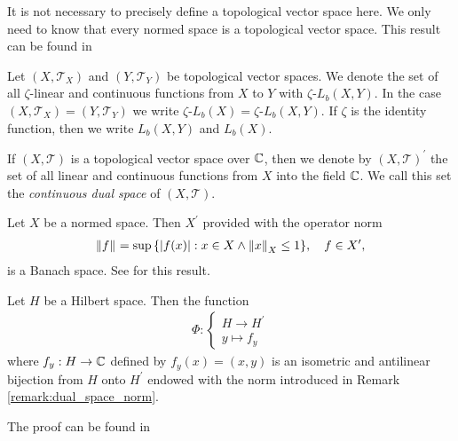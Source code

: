 It is not necessary to precisely define a topological vector space here. We only need to know that every normed space is a topological vector space. This result can be found in \cite[p. 18]{FAna1}


\begin{definition}
	Let $(X,\mathcal{T}_X)$ and $(Y,\mathcal{T}_Y)$ be topological vector spaces. We denote the set of all $\zeta$-linear and continuous functions from $X$ to $Y$ with $\zeta$-$L_b(X,Y)$. In the case $(X, \mathcal{T}_X) = (Y, \mathcal{T}_Y)$ we write $\zeta$-$L_b(X) = \zeta$-$L_b(X,Y)$. If $\zeta$ is the identity function, then we write $L_b(X,Y)$ and $L_b(X)$.
\end{definition}


\begin{definition}
	If $(X, \mathcal{T})$ is a topological vector space over $\C$, then we denote by $(X, \mathcal{T})^\prime$ the set of all linear and continuous functions from $X$ into the field $\C$. We call this set the \textit{continuous dual space} of $(X, \mathcal{T})$.
\end{definition}

\begin{remark} \label{remark:dual_space_norm}
	Let $X$ be a normed space. Then $X^\prime$ provided with the operator norm 
	\begin{align*}
		\norm{f} = \sup\Bbraces{\vbraces{f(x)} : x \in X \land \norm[X]{x} \leq 1}, \quad f \in X^\prime,
	\end{align*}
	is a Banach space. See \cite[p. 25]{FAna1} for this result.
\end{remark}


\begin{proposition} \label{prop:riesz}
	Let $H$ be a Hilbert space. Then the function
	\begin{align*}
		\Phi: 
		\begin{cases}
			H \to H^\prime \\
			y \mapsto f_y
		\end{cases}
	\end{align*}
	where $f_y: H \to \C$ defined by $f_y(x) = (x,y)$ is an isometric and antilinear bijection from $H$ onto $H^\prime$ endowed with the norm introduced in Remark \ref{remark:dual_space_norm}.
\end{proposition}

The proof can be found in \cite[p. 50]{FAna1}


